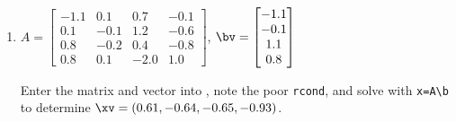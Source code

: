 \begin{example}
\begin{enumerate}
\begin{solution}
\end{solution}


\item \(A=\begin{bmatrix} -1.1&0.1&0.7&-0.1
\\0.1&-0.1&1.2&-0.6
\\0.8&-0.2&0.4&-0.8
\\0.8&0.1&-2.0&1.0 \end{bmatrix}\),
\(\bv=\begin{bmatrix} -1.1
\\-0.1
\\1.1
\\0.8
 \end{bmatrix}\)
\begin{solution} 
Enter the matrix and vector into \script, note the poor \verb|rcond|, and solve with \verb|x=A\b| to determine \(\xv=(0.61,-0.64,-0.65,-0.93)\).
\setbox\ajrqrbox\hbox{}%
\marginpar{\usebox{\ajrqrbox\\[2ex]}}%


\end{solution}
\end{enumerate}
\end{example}
